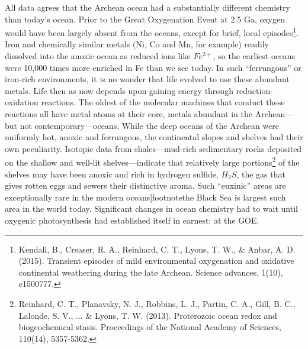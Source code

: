 {All data agrees that the Archean ocean had a substantially different chemistry than today's ocean. Prior to the Great Oxygenation Event at 2.5 Ga, oxygen would have been largely absent from the oceans, except for brief, local episodes\footnote{Kendall, B., Creaser, R. A., Reinhard, C. T., Lyons, T. W., \& Anbar, A. D. (2015). Transient episodes of mild environmental oxygenation and oxidative continental weathering during the late Archean. Science advances, 1(10), e1500777.}. Iron and chemically similar metals (Ni, Co and Mn, for example) readily dissolved into the anoxic ocean as reduced ions like $Fe^{2+}$, so the earliest oceans were 10,000 times more enriched in Fe than we see today. In such ``ferrungous'' or iron-rich environments, it is no wonder that life evolved to use these abundant metals. Life then as now depends upon gaining energy through reduction-oxidation reactions. The oldest of the molecular machines that conduct these reactions all have metal atoms at their core, metals abundant in the Archean---but not contemporary---oceans. While the deep oceans of the Archean were uniformly hot, anoxic and ferrungous, the continental slopes and shelves had their own peculiarity. Isotopic data from shales---mud-rich sedimentary rocks deposited on the shallow and well-lit shelves---indicate that relatively large portions\footnote{Reinhard, C. T., Planavsky, N. J., Robbins, L. J., Partin, C. A., Gill, B. C., Lalonde, S. V., ... \& Lyons, T. W. (2013). Proterozoic ocean redox and biogeochemical stasis. Proceedings of the National Academy of Sciences, 110(14), 5357-5362.} of the shelves may have been anoxic and rich in hydrogen sulfide, $H_2S$, the gas that gives rotten eggs and sewers their distinctive aroma. Such ``euxinic'' areas are exceptionally rare in the modern oceans]footnote{the Black Sea is largest such area in the world today}. Significant changes in ocean chemistry had to wait until oxygenic photosynthesis had established itself in earnest: at the GOE.  
}
